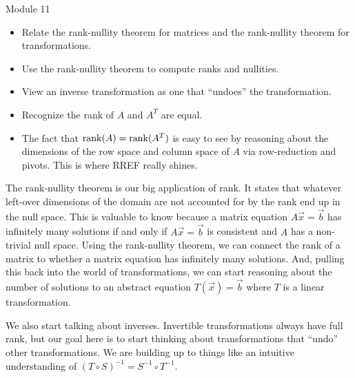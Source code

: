 \documentclass{workbook}
\begin{document}
\begin{lesson}

	Module 11

	\begin{itemize}
		\item Relate the rank-nullity theorem for matrices and the rank-nullity theorem for transformations.
		\item Use the rank-nullity theorem to compute ranks and nullities.
		\item View an inverse transformation as one that ``undoes'' the transformation.
		\item Recognize the rank of $A$ and $A^T$ are equal.
	\end{itemize}

	\begin{annotation}
		\begin{notes}
			\begin{itemize}
				\item The fact that $\operatorname{rank}(A)=\operatorname{rank}(A^T)$ is easy to see by reasoning
					about the dimensions of the row space and column space of $A$
					via row-reduction and pivots. This is where RREF really shines.
			\end{itemize}
		\end{notes}
	\end{annotation}
	The rank-nullity theorem is our big application of rank. It states that whatever
	left-over dimensions of the domain are not accounted for by the rank end up in the null space.
	This is valuable to know because a matrix equation $A\vec x=\vec b$ has infinitely many
	solutions if and only if $A\vec x=\vec b$ is consistent and $A$ has a non-trivial null space. Using
	the rank-nullity theorem, we can connect the rank of a matrix to whether a matrix equation has infinitely
	many solutions. And, pulling this back into the world of transformations, we can start reasoning
	about the number of solutions to an abstract equation $T(\vec x)=\vec b$ where $T$ is a linear
	transformation.

	We also start talking about inverses. Invertible transformations always have full rank, but
	our goal here is to start thinking about transformations that ``undo'' other transformations. We
	are building up to things like an intuitive understanding of $(T\circ S)^{-1} = S^{-1}\circ T^{-1}$.

\end{lesson}
\end{document}
